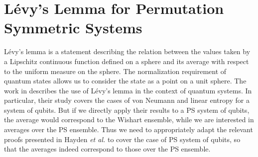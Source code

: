 \documentclass[pre,aps,showpacs,showkeys,twocolumn]{revtex4-1}
\theoremstyle{definition}
\theoremstyle{remark}
\begin{document}
\section{\label{apdx:permsymmlevy}L\'evy's Lemma for Permutation Symmetric Systems}
L\'evy's lemma is a statement describing the relation between the values taken by a Lipschitz continuous function defined on a sphere and its average with respect to the uniform measure on the sphere. The normalization requirement of quantum states allows us to consider the state as a point on a unit sphere. The work in \cite{hayden2006aspects} describes the use of L\'evy's lemma in the context of quantum systems. In particular, their study covers the cases of von Neumann and linear entropy for a system of qubits. But if we directly apply their results to a PS system of qubits, the average would correspond to the Wishart ensemble, while we are interested in averages over the PS ensemble. Thus we need to appropriately adapt the relevant proofs presented in Hayden \textit{et al.} \cite{hayden2006aspects} to cover the case of PS system of qubits, so that the averages indeed correspond to those over the PS ensemble.
\end{document}
